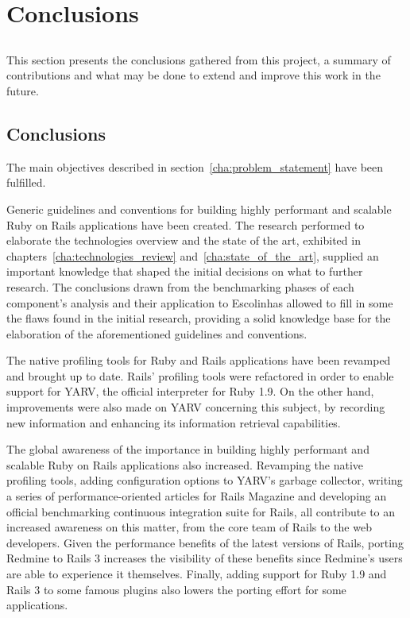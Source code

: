 \chapter{Conclusions} %
\label{cha:conclusions}
\section*{} %
This section presents the conclusions gathered from this project, a summary of contributions and what may be done to extend and improve this work in the future.

\section{Conclusions}
The main objectives described in section~\ref{cha:problem_statement} have been fulfilled.

Generic guidelines and conventions for building highly performant and scalable Ruby on Rails applications have been created. The research performed to elaborate the technologies overview and the state of the art, exhibited in chapters~\ref{cha:technologies_review} and~\ref{cha:state_of_the_art}, supplied an important knowledge that shaped the initial decisions on what to further research. The conclusions drawn from the benchmarking phases of each component's analysis and their application to Escolinhas allowed to fill in some the flaws found in the initial research, providing a solid knowledge base for the elaboration of the aforementioned guidelines and conventions.

The native profiling tools for Ruby and Rails applications have been revamped and brought up to date. Rails' profiling tools were refactored in order to enable support for YARV, the official interpreter for Ruby 1.9. On the other hand, improvements were also made on YARV concerning this subject, by recording new information and enhancing its information retrieval capabilities.

The global awareness of the importance in building highly performant and scalable Ruby on Rails applications also increased. Revamping the native profiling tools, adding configuration options to YARV's garbage collector, writing a series of performance-oriented articles for Rails Magazine and developing an official benchmarking continuous integration suite for Rails, all contribute to an increased awareness on this matter, from the core team of Rails to the web developers. Given the performance benefits of the latest versions of Rails, porting Redmine to Rails 3 increases the visibility of these benefits since Redmine's users are able to experience it themselves. Finally, adding support for Ruby 1.9 and Rails 3 to some famous plugins also lowers the porting effort for some applications.

